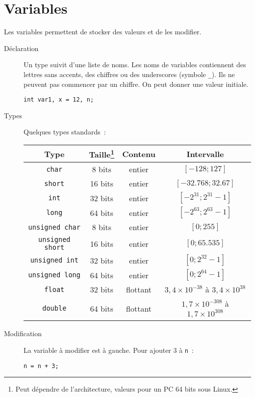 \documentclass[a4paper,10pt]{article}
\begin{document}
  \section{Variables}
  Les variables permettent de stocker des valeurs et de les modifier.
  \begin{description}
    \item[Déclaration] Un type suivit d'une liste de noms. Les noms de variables contiennent des lettres sans accents, des chiffres ou des underscores (symbole \texttt{\_}). Ils ne peuvent pas commencer par un chiffre. On peut donner une valeur initiale.
      \begin{verbatim}
int var1, x = 12, n;
      \end{verbatim}
    \item[Types] Quelques types standards~:\\
      \begin{tabu}{c|c|c|c}
        Type & Taille\footnote{Peut dépendre de l'architecture, valeurs pour un PC 64 bits sous Linux.} & Contenu & Intervalle\\
        \hline
        \texttt{char} & 8 bits & entier & $[- 128; 127]$\\
        \texttt{short} & 16 bits & entier & $[-32.768; 32 .67]$\\
        \texttt{int} & 32 bits & entier & $[- 2^{31}; 2^{31} - 1]$\\
        \texttt{long} & 64 bits & entier & $[- 2^{63}; 2^{63} - 1]$\\
        \hline
        \texttt{unsigned char} & 8 bits & entier & $[0; 255]$\\
        \texttt{unsigned short} & 16 bits & entier & $[0; 65.535]$\\
        \texttt{unsigned int} & 32 bits & entier & $[0; 2^{32} - 1]$\\
        \texttt{unsigned long} & 64 bits & entier & $[0; 2^{64} - 1]$\\
        \hline
        \texttt{float} & 32 bits & flottant & $3,4 \times 10^{-38}$ à $3,4 \times 10^{38}$\\
        \texttt{double} & 64 bits & flottant & $1,7 \times 10^{-308}$ à $1,7 \times 10^{308}$
      \end{tabu}
    \item[Modification] La variable à modifier est à gauche. Pour ajouter 3 à \texttt{n}~:
      \begin{verbatim}
n = n + 3;
      \end{verbatim}
  \end{description}
  
\end{document}
